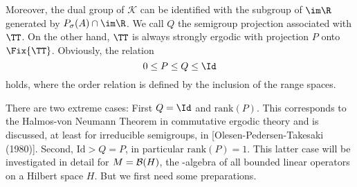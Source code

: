\newpage

Moreover, the dual group of $\mathcal{K}$ can be identified with the subgroup of $\im \R $ generated by 
$P_{\sigma}(A) \cap \im \R $.
We call $Q$ the semigroup projection associated with $\TT$.
On the other hand, $\TT$ is always strongly ergodic with projection $P$ onto $\Fix{\TT}$.
Obviously, the relation
\[
    0 \leq P \leq Q \leq \Id
\]
holds, where the order relation is defined by the inclusion of the range spaces.

There are two extreme cases: First $Q = \Id$ and $ \text{rank}(P)$.
This corresponds to the Halmos-von Neumann Theorem in commutative ergodic theory and is discussed, at least for irreducible semigroups, in [Olesen-Pedersen-Takesaki (1980)].
Second, $\text{Id} > Q = P$, in particular $\text{rank}(P) = 1$.
This latter case will be investigated in detail for $M = \mathcal{B}(H) $, the \WA-algebra of all bounded linear operators on a Hilbert space $H$.
But we first need some preparations.

